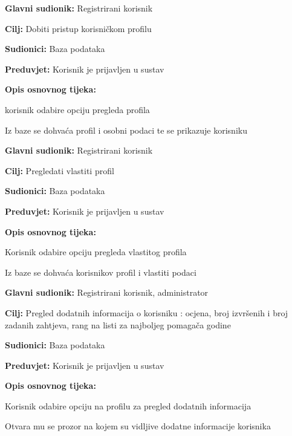 \noindent {}
\begin{packed_item}
	
	\item \textbf{Glavni sudionik: } Registrirani korisnik
	\item  \textbf{Cilj:} Dobiti pristup korisničkom profilu
	\item  \textbf{Sudionici:} Baza podataka
	\item  \textbf{Preduvjet:} Korisnik je prijavljen u sustav
	\item  \textbf{Opis osnovnog tijeka:}
	
	\item[] \begin{packed_enum}
		
		\item korisnik odabire opciju pregleda profila
		\item Iz baze se dohvaća profil i osobni podaci te se prikazuje korisniku
	\end{packed_enum}
\end{packed_item}

\noindent {}
\begin{packed_item}
	
	\item \textbf{Glavni sudionik: } Registrirani korisnik
	\item  \textbf{Cilj:} Pregledati vlastiti profil
	\item  \textbf{Sudionici:} Baza podataka
	\item  \textbf{Preduvjet:} Korisnik je prijavljen u sustav
	\item  \textbf{Opis osnovnog tijeka:}
	\item[] \begin{packed_enum}
		\item Korisnik odabire opciju pregleda vlastitog profila
		\item Iz baze se dohvaća korisnikov profil i vlastiti podaci
	\end{packed_enum}
\end{packed_item}
\newpage
\noindent {}
\begin{packed_item}
	\item \textbf{Glavni sudionik: }Registrirani korisnik, administrator
	\item  \textbf{Cilj:} Pregled dodatnih informacija o korisniku : ocjena, broj izvršenih i broj zadanih zahtjeva, rang na listi za najboljeg pomagača godine
	\item  \textbf{Sudionici:} Baza podataka
	\item  \textbf{Preduvjet:} Korisnik je prijavljen u sustav
	\item  \textbf{Opis osnovnog tijeka:}
	\item[] \begin{packed_enum}
		\item Korisnik odabire opciju na profilu za pregled dodatnih informacija  
		\item Otvara mu se prozor na kojem su vidljive dodatne informacije korisnika
	\end{packed_enum}
\end{packed_item}

